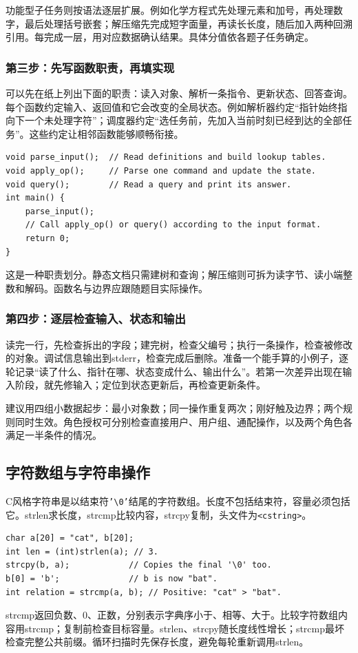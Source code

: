功能型子任务则按语法逐层扩展。例如化学方程式先处理元素和加号，再处理数字，最后处理括号嵌套；解压缩先完成短字面量，再读长长度，随后加入两种回溯引用。每完成一层，用对应数据确认结果。具体分值依各题子任务确定。

\subsubsection{第三步：先写函数职责，再填实现}
可以先在纸上列出下面的职责：读入对象、解析一条指令、更新状态、回答查询。每个函数约定输入、返回值和它会改变的全局状态。例如解析器约定“指针始终指向下一个未处理字符”；调度器约定“选任务前，先加入当前时刻已经到达的全部任务”。这些约定让相邻函数能够顺畅衔接。
\begin{lstlisting}
void parse_input();  // Read definitions and build lookup tables.
void apply_op();     // Parse one command and update the state.
void query();        // Read a query and print its answer.
int main() {
    parse_input();
    // Call apply_op() or query() according to the input format.
    return 0;
}
\end{lstlisting}
这是一种职责划分。静态文档只需建树和查询；解压缩则可拆为读字节、读小端整数和解码。函数名与边界应跟随题目实际操作。

\subsubsection{第四步：逐层检查输入、状态和输出}
读完一行，先检查拆出的字段；建完树，检查父编号；执行一条操作，检查被修改的对象。调试信息输出到stderr，检查完成后删除。准备一个能手算的小例子，逐轮记录“读了什么、指针在哪、状态变成什么、输出什么”。若第一次差异出现在输入阶段，就先修输入；定位到状态更新后，再检查更新条件。

建议用四组小数据起步：最小对象数；同一操作重复两次；刚好触及边界；两个规则同时生效。角色授权可分别检查直接用户、用户组、通配操作，以及两个角色各满足一半条件的情况。

\subsection{字符数组与字符串操作}
C风格字符串是以结束符\texttt{'\textbackslash0'}结尾的字符数组。长度不包括结束符，容量必须包括它。strlen求长度，strcmp比较内容，strcpy复制，头文件为\texttt{<cstring>}。
\begin{lstlisting}
char a[20] = "cat", b[20];
int len = (int)strlen(a); // 3.
strcpy(b, a);            // Copies the final '\0' too.
b[0] = 'b';              // b is now "bat".
int relation = strcmp(a, b); // Positive: "cat" > "bat".
\end{lstlisting}
strcmp返回负数、0、正数，分别表示字典序小于、相等、大于。比较字符数组内容用strcmp；复制前检查目标容量。strlen、strcpy随长度线性增长；strcmp最坏检查完整公共前缀。循环扫描时先保存长度，避免每轮重新调用strlen。

